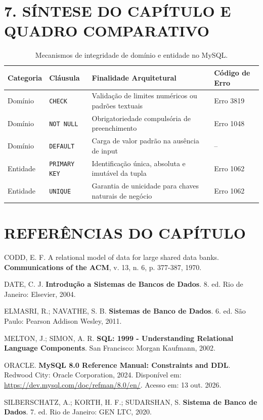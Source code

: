 \newpage

\section*{7. SÍNTESE DO CAPÍTULO E QUADRO COMPARATIVO}

\begin{table}[h!]
\centering
\small
\begin{tabular}{|l|l|p{5.5cm}|l|}
\hline
\textbf{Categoria} & \textbf{Cláusula} & \textbf{Finalidade Arquitetural} & \textbf{Código de Erro} \\ \hline
Domínio & \texttt{CHECK} & Validação de limites numéricos ou padrões textuais & Erro 3819 \\ \hline
Domínio & \texttt{NOT NULL} & Obrigatoriedade compulsória de preenchimento & Erro 1048 \\ \hline
Domínio & \texttt{DEFAULT} & Carga de valor padrão na ausência de input & -- \\ \hline
Entidade & \texttt{PRIMARY KEY} & Identificação única, absoluta e imutável da tupla & Erro 1062 \\ \hline
Entidade & \texttt{UNIQUE} & Garantia de unicidade para chaves naturais de negócio & Erro 1062 \\ \hline
\end{tabular}
\caption{Mecanismos de integridade de domínio e entidade no MySQL.}
\end{table}

\section*{REFERÊNCIAS DO CAPÍTULO}

\noindent CODD, E. F. A relational model of data for large shared data banks. \textbf{Communications of the ACM}, v. 13, n. 6, p. 377-387, 1970.

\vspace{0.8em}
\noindent DATE, C. J. \textbf{Introdução a Sistemas de Bancos de Dados}. 8. ed. Rio de Janeiro: Elsevier, 2004.

\vspace{0.8em}
\noindent ELMASRI, R.; NAVATHE, S. B. \textbf{Sistemas de Banco de Dados}. 6. ed. São Paulo: Pearson Addison Wesley, 2011.

\vspace{0.8em}
\noindent MELTON, J.; SIMON, A. R. \textbf{SQL: 1999 - Understanding Relational Language Components}. San Francisco: Morgan Kaufmann, 2002.

\vspace{0.8em}
\noindent ORACLE. \textbf{MySQL 8.0 Reference Manual: Constraints and DDL}. Redwood City: Oracle Corporation, 2024. Disponível em: \url{https://dev.mysql.com/doc/refman/8.0/en/}. Acesso em: 13 out. 2026.

\vspace{0.8em}
\noindent SILBERSCHATZ, A.; KORTH, H. F.; SUDARSHAN, S. \textbf{Sistema de Banco de Dados}. 7. ed. Rio de Janeiro: GEN LTC, 2020.
